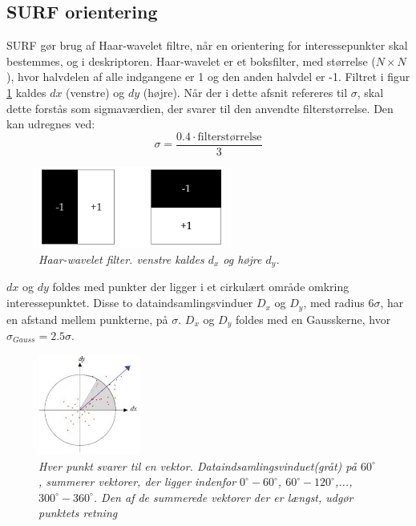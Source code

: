 \subsection{SURF orientering}
SURF gør brug af Haar-wavelet filtre, når en orientering for interessepunkter skal bestemmes, og i deskriptoren. Haar-wavelet er et boksfilter, med størrelse ($N\times N$), hvor halvdelen af alle indgangene er 1 og den anden halvdel er -1. Filtret i figur \ref{fig:haarwavelet} kaldes $dx$ (venstre) og $dy$ (højre).
Når der i dette afsnit refereres til $\sigma$, skal dette forstås som sigmaværdien, der svarer til den anvendte filterstørrelse. Den kan udregnes ved:
\begin{equation}
\sigma = \dfrac{0.4\cdot\text{filterstørrelse}}{3}
\end{equation}
\begin{figure}[H]
    \centering
    \includegraphics[width=0.55\textwidth]{fig/haarwavelet.png}
     \vspace{-1em}
    \begin{center}    
       \caption{\footnotesize \textit{{Haar-wavelet filter. venstre kaldes $d_x$ og højre $d_y$.}}}
    \label{fig:haarwavelet}
     \end{center}
     \vspace{-2.5em}
  \end{figure} \noindent
$dx$ og $dy$ foldes med punkter der ligger i et cirkulært område omkring interessepunktet. Disse to dataindsamlingsvinduer $D_x$ og $D_y$, med radius $6\sigma$, har en afstand mellem punkterne, på $\sigma$. $D_x$ og $D_y$ foldes med en Gausskerne, hvor $\sigma_{Gauss} = 2.5\sigma$.
\begin{figure}[H]
    \centering
    \includegraphics[width=0.3\textwidth]{fig/surforientation.jpg}
     \vspace{-1em}
    \begin{center}    
       \caption{{\footnotesize \textit{Hver punkt svarer til en vektor. Dataindsamlingsvinduet(gråt) på $60^{\circ}$, summerer vektorer, der ligger indenfor $0^{\circ}-60^{\circ}$, $60^{\circ}-120^{\circ}$,..., $300^{\circ}-360^{\circ}$. Den af de summerede vektorer der er længst, udgør punktets retning}}}
    \label{fig:surforientation}
     \end{center}
     \vspace{-2.5em}
  \end{figure} \noindent
